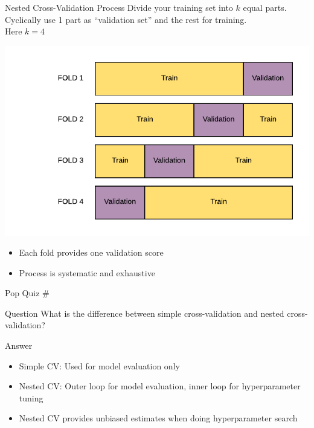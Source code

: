 \documentclass[usenames,dvipsnames]{beamer}
\newcounter{popquiz}
\begin{document}
\begin{frame}{Nested Cross-Validation Process}
Divide your training set into $k$ equal parts.\\
Cyclically use 1 part as ``validation set'' and the rest for training.\\
Here $k = 4$
\begin{center}
\includegraphics[scale=0.7]{../assets/cross-validation/diagrams/cross-validation.pdf}
\end{center}
\begin{itemize}
	\item \pause Each fold provides one validation score
	\item \pause Process is systematic and exhaustive
\end{itemize}
\end{frame}

\begin{frame}{Pop Quiz \#\thepopquiz}
\begin{block}{Question}
What is the difference between simple cross-validation and nested cross-validation?
\end{block}
\pause
\begin{block}{Answer}
\begin{itemize}
	\item Simple CV: Used for model evaluation only
	\item Nested CV: Outer loop for model evaluation, inner loop for hyperparameter tuning
	\item Nested CV provides unbiased estimates when doing hyperparameter search
\end{itemize}
\end{block}
\end{frame}
\end{document}
